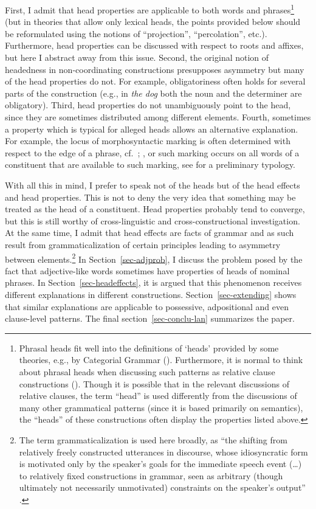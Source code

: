 \documentclass[output=paper,nobabel,draftmode  ,colorlinks, citecolor=brown]{langscibook}
\begin{document}
First, I admit that head properties are applicable to both words and phrases\footnote{Phrasal heads fit well into the definitions of ‘heads’ provided by some theories, e.g., by Categorial Grammar (\cite{Dowty2003}). Furthermore, it is normal to think about phrasal heads when discussing such patterns as relative clause constructions (\cite{KC77a}). Though it is possible that in the relevant discussions of relative clauses, the term ``head'' is used differently from the discussions of many other grammatical patterns (since it is based primarily on semantics), the ``heads'' of these constructions often display the properties listed above.} (but in theories that allow only lexical heads, the points provided below should be reformulated using the notions of ``projection'', ``percolation'', etc.). Furthermore, head properties can be discussed with respect to roots and affixes, but here I abstract away from this issue. Second, the original notion of headedness in non-coordinating constructions presupposes asymmetry but many of the head properties do not. For example, obligatoriness often holds for several parts of the construction (e.g., in \emph{the dog} both the noun and the determiner are obligatory). Third, head properties do not unambiguously point to the head, since they are sometimes distributed among different elements. Fourth, sometimes a property which is typical for alleged heads allows an alternative explanation. For example, the locus of morphosyntactic marking is often determined with respect to the edge of a phrase, cf.\ \citet{Klavans1985}; \citet[210]{Anderson92a-u},
or such marking occurs on all words of a constituent that are available to such marking, see \citet{LanderNichols2020}  for a preliminary typology. 

With all this in mind, I prefer to speak not of the heads but of the head effects and head properties. This is not to deny the very idea that something may be treated as the head of a constituent. Head properties probably tend to converge, but this is still worthy of cross-linguistic and cross-constructional investigation. At the same time, I admit that head effects are facts of grammar and as such result from grammaticalization of certain principles leading to asymmetry between elements.\footnote{The term grammaticalization is used here broadly, as ``the shifting from relatively freely constructed utterances in discourse, whose idiosyncratic form is motivated only by the speaker's goals for the immediate speech event (…) to relatively fixed constructions in grammar, seen as arbitrary (though ultimately not necessarily unmotivated) constraints on the speaker's output'' \citep[346]{Dubois1984}.} 
In Section~\ref{sec-adjprob}, I discuss the problem posed by the fact that adjective-like words sometimes have properties of heads of nominal phrases. In Section~\ref{sec-headeffects}, it is argued that this phenomenon receives different explanations in different constructions. Section~\ref{sec-extending} shows that similar explanations are applicable to possessive, adpositional and even clause-level patterns. The final section~\ref{sec-conclu-lan} summarizes the paper.
\end{document}
